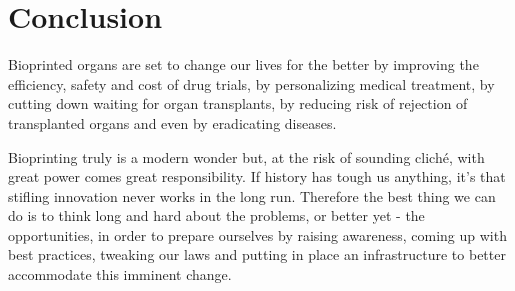 \documentclass[12pt]{article} %
\begin{document}
\newpage 

\section{Conclusion} %

Bioprinted organs are set to change our lives for the better by improving the efficiency, safety and cost of drug trials, by personalizing medical treatment, by cutting down waiting for organ transplants, by reducing risk of rejection of transplanted organs and even by eradicating diseases.  

Bioprinting truly is a modern wonder but, at the risk of sounding cliché, with great power comes great responsibility. 
If history has tough us anything, it's that stifling innovation never works in the long run. Therefore the best thing we can do is to think long and hard about the problems, or better yet - the opportunities, in order to prepare ourselves by raising awareness, coming up with best practices, tweaking our laws and putting in place an infrastructure to better accommodate this imminent change.

\newpage

\end{document}
